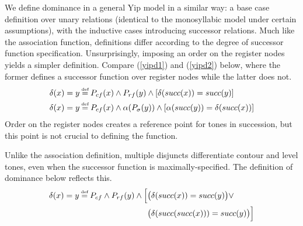 \documentclass{article}
\newcommand\myeq{\mathrel{\stackrel{\makebox[0pt]{\mbox{\normalfont\tiny def}}}{=}}}
\begin{document}
We define dominance in a general Yip model in a similar way: a base case definition over unary relations (identical to the monosyllabic model under certain assumptions), with the inductive cases introducing successor relations. Much like the association function, definitions differ according to the degree of successor function specification. Unsurprisingly, imposing an order on the register nodes yields a simpler definition. Compare (\ref{yipd1}) and (\ref{yipd2}) below, where the former defines a successor function over register nodes while the latter does not.
\begin{align}
\delta(x)=y&\myeq P_{cf}(x)\land P_{rf}(y)\land[\delta(succ(x))=succ(y)] \label{yipd1} \\
\delta(x)=y&\myeq P_{cf}(x)\land \alpha(P_{\sigma}(y))\land[\alpha(succ(y))=\delta(succ(x))] \label{yipd2}
\end{align}  
Order on the register nodes creates a reference point for tones in succession, but this point is not crucial to defining the function.
\begin{center}
\end{center}
Unlike the association definition, multiple disjuncts differentiate contour and level tones, even when the successor function is maximally-specified. The definition of dominance below reflects this. 
\begin{equation}
\begin{aligned}
\delta(x)=y\myeq P_{cf}\land P_{rf}(y)\land\Big[&\big(\delta(succ(x))=succ(y)\big)\lor \\
&\big(\delta(succ(succ(x)))=succ(y)\big)\Big]
\end{aligned}
\end{equation}
\end{document}

